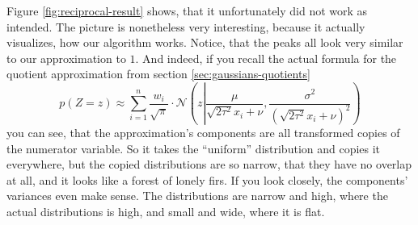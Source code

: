 \documentclass[11pt,a4paper]{book}
\begin{document}
Figure \ref{fig:reciprocal-result} shows, that it unfortunately did not work as
intended. The picture is nonetheless very interesting, because it actually
visualizes, how our algorithm works. Notice, that the peaks all look very
similar to our approximation to $1$. And indeed, if you recall the actual
formula for the quotient approximation from section
\ref{sec:gaussians-quotients}
\begin{equation*}
  p(Z = z) \approx \sum_{i = 1}^{n} \frac{w_{i}}{\sqrt{\pi}} \cdot \mathcal{N}\left( z \left| \frac{\mu}{\sqrt{2 \tau^{2}} x_{i} + \nu}, \frac{\sigma^{2}}{\left(\sqrt{2 \tau^{2}} x_{i} + \nu\right)^{2}} \right.\right)
\end{equation*}
you can see, that the approximation's components are all transformed copies of
the numerator variable. So it takes the ``uniform'' distribution and copies it
everywhere, but the copied distributions are so narrow, that they have no
overlap at all, and it looks like a forest of lonely firs. If you look closely,
the components' variances even make sense. The distributions are narrow and
high, where the actual distributions is high, and small and wide, where it is
flat.
\end{document}
